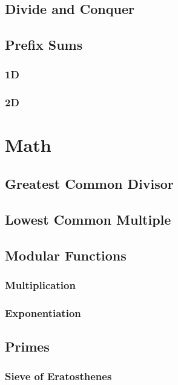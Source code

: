 \documentclass{article}
\begin{document}

\subsection{Divide and Conquer}


\subsection{Prefix Sums}
\subsubsection{1D}

\subsubsection{2D}


\section{Math}
\subsection{Greatest Common Divisor}

\subsection{Lowest Common Multiple}


\subsection{Modular Functions}
\subsubsection{Multiplication}

\subsubsection{Exponentiation}


\subsection{Primes}
\subsubsection{Sieve of Eratosthenes}

\end{document}
